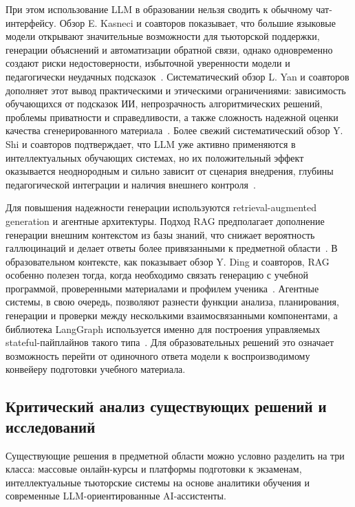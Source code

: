 \documentclass[a4paper,12pt]{extarticle}
\begin{document}
При этом использование LLM в образовании нельзя сводить к обычному чат-интерфейсу. Обзор E. Kasneci и соавторов показывает, что большие языковые модели открывают значительные возможности для тьюторской поддержки, генерации объяснений и автоматизации обратной связи, однако одновременно создают риски недостоверности, избыточной уверенности модели и педагогически неудачных подсказок~\cite{kasneci2023chatgpt}. Систематический обзор L. Yan и соавторов дополняет этот вывод практическими и этическими ограничениями: зависимость обучающихся от подсказок ИИ, непрозрачность алгоритмических решений, проблемы приватности и справедливости, а также сложность надежной оценки качества сгенерированного материала~\cite{yan2024challenges}. Более свежий систематический обзор Y. Shi и соавторов подтверждает, что LLM уже активно применяются в интеллектуальных обучающих системах, но их положительный эффект оказывается неоднородным и сильно зависит от сценария внедрения, глубины педагогической интеграции и наличия внешнего контроля~\cite{shi2025llmedu}.

Для повышения надежности генерации используются retrieval-augmented generation и агентные архитектуры. Подход RAG предполагает дополнение генерации внешним контекстом из базы знаний, что снижает вероятность галлюцинаций и делает ответы более привязанными к предметной области~\cite{lewis2020rag,gao2024ragsurvey}. В образовательном контексте, как показывает обзор Y. Ding и соавторов, RAG особенно полезен тогда, когда необходимо связать генерацию с учебной программой, проверенными материалами и профилем ученика~\cite{ding2025ragedu}. Агентные системы, в свою очередь, позволяют разнести функции анализа, планирования, генерации и проверки между несколькими взаимосвязанными компонентами, а библиотека LangGraph используется именно для построения управляемых stateful-пайплайнов такого типа~\cite{langchain2024}. Для образовательных решений это означает возможность перейти от одиночного ответа модели к воспроизводимому конвейеру подготовки учебного материала.

\subsection{Критический анализ существующих решений и исследований}

Существующие решения в предметной области можно условно разделить на три класса: массовые онлайн-курсы и платформы подготовки к экзаменам, интеллектуальные тьюторские системы на основе аналитики обучения и современные LLM-ориентированные AI-ассистенты.
\end{document}
